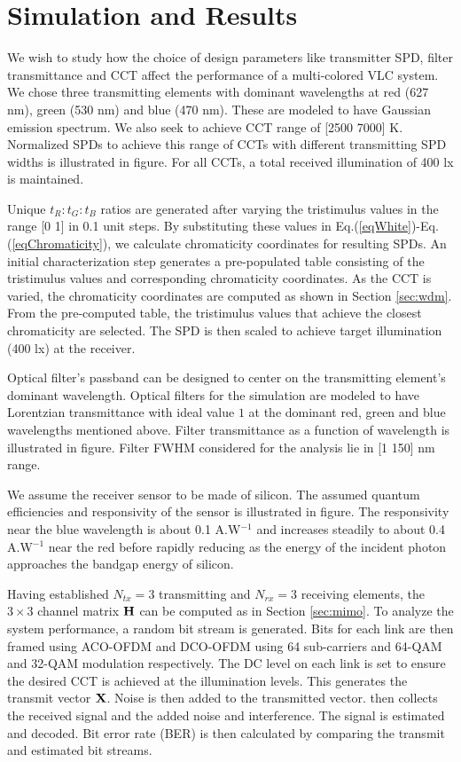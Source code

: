 \section{Simulation and Results}\label{sec:results}
We wish to study how the choice of design parameters like transmitter SPD, filter transmittance and CCT affect the performance of a multi-colored VLC system. We chose three transmitting elements with dominant wavelengths at red (627 nm), green (530 nm) and blue (470 nm). These are modeled to have Gaussian emission spectrum. We also seek to achieve CCT range of [2500 7000] K. Normalized SPDs to achieve this range of CCTs with different transmitting SPD widths is illustrated in {\color{red}figure}. For all CCTs, a total received illumination of 400 lx is maintained. 

Unique $t_R:t_G:t_B$ ratios are generated after varying the tristimulus values in the range [0 1] in 0.1 unit steps. By substituting these values in Eq.(\ref{eqWhite})-Eq.(\ref{eqChromaticity}), we calculate chromaticity coordinates for resulting SPDs. An initial characterization step generates a pre-populated table consisting of the tristimulus values and corresponding chromaticity coordinates. As the CCT is varied, the chromaticity coordinates are computed as shown in Section \ref{sec:wdm}. From the pre-computed table, the tristimulus values that achieve the closest chromaticity are selected. The SPD is then scaled to achieve target illumination (400 lx) at the receiver. 

Optical filter's passband can be designed to center on the transmitting element's dominant wavelength. Optical filters for the simulation are modeled to have Lorentzian transmittance with ideal value $1$ at the dominant red, green and blue wavelengths mentioned above. Filter transmittance as a function of wavelength is illustrated in {\color{red}figure}. Filter FWHM considered for the analysis lie in [1 150] nm range.

We assume the receiver sensor to be made of silicon. The assumed quantum efficiencies and responsivity of the sensor is illustrated in {\color{red}figure}. The responsivity near the blue wavelength is about {\color{red}0.1 A.W$^{-1}$} and increases steadily to about {\color{red}0.4 A.W$^{-1}$} near the red before rapidly reducing as the energy of the incident photon approaches the bandgap energy of silicon.

Having established $N_{tx} = 3$ transmitting and $N_{rx} = 3$ receiving elements, the $3\times 3$ channel matrix ${\bf{H}}$ can be computed as in Section \ref{sec:mimo}. To analyze the system performance, a random bit stream is generated. Bits for each link are then framed using ACO-OFDM and DCO-OFDM using 64 sub-carriers and 64-QAM and 32-QAM modulation respectively. The DC level on each link is set to ensure the desired CCT is achieved at the illumination levels. This generates the transmit vector ${\bf{X}}$. Noise is then added to the transmitted vector.  then collects the received signal and the added noise and interference. The signal is estimated and decoded. Bit error rate (BER) is then calculated by comparing the transmit and estimated bit streams.

